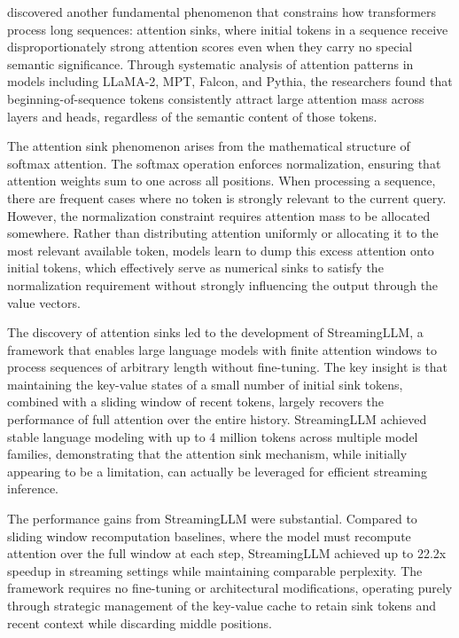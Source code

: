 \citet{xiao2024efficient} discovered another fundamental phenomenon that constrains how transformers process long sequences: attention sinks, where initial tokens in a sequence receive disproportionately strong attention scores even when they carry no special semantic significance. Through systematic analysis of attention patterns in models including LLaMA-2, MPT, Falcon, and Pythia, the researchers found that beginning-of-sequence tokens consistently attract large attention mass across layers and heads, regardless of the semantic content of those tokens.

The attention sink phenomenon arises from the mathematical structure of softmax attention. The softmax operation enforces normalization, ensuring that attention weights sum to one across all positions. When processing a sequence, there are frequent cases where no token is strongly relevant to the current query. However, the normalization constraint requires attention mass to be allocated somewhere. Rather than distributing attention uniformly or allocating it to the most relevant available token, models learn to dump this excess attention onto initial tokens, which effectively serve as numerical sinks to satisfy the normalization requirement without strongly influencing the output through the value vectors.

The discovery of attention sinks led to the development of StreamingLLM, a framework that enables large language models with finite attention windows to process sequences of arbitrary length without fine-tuning. The key insight is that maintaining the key-value states of a small number of initial sink tokens, combined with a sliding window of recent tokens, largely recovers the performance of full attention over the entire history. StreamingLLM achieved stable language modeling with up to 4 million tokens across multiple model families, demonstrating that the attention sink mechanism, while initially appearing to be a limitation, can actually be leveraged for efficient streaming inference.

The performance gains from StreamingLLM were substantial. Compared to sliding window recomputation baselines, where the model must recompute attention over the full window at each step, StreamingLLM achieved up to 22.2x speedup in streaming settings while maintaining comparable perplexity. The framework requires no fine-tuning or architectural modifications, operating purely through strategic management of the key-value cache to retain sink tokens and recent context while discarding middle positions.


